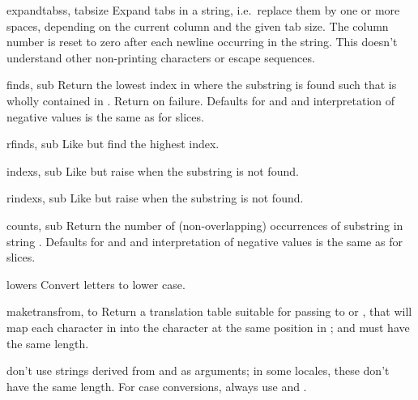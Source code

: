\begin{funcdesc}{expandtabs}{s, tabsize}
Expand tabs in a string, i.e.\ replace them by one or more spaces,
depending on the current column and the given tab size.  The column
number is reset to zero after each newline occurring in the string.
This doesn't understand other non-printing characters or escape
sequences.
\end{funcdesc}

\begin{funcdesc}{find}{s, sub}
Return the lowest index in  where the substring  is
found such that  is wholly contained in
.  Return  on failure.
Defaults for  and  and interpretation of negative
values is the same as for slices.
\end{funcdesc}

\begin{funcdesc}{rfind}{s, sub}
Like  but find the highest index.
\end{funcdesc}

\begin{funcdesc}{index}{s, sub}
Like  but raise  when the
substring is not found.
\end{funcdesc}

\begin{funcdesc}{rindex}{s, sub}
Like  but raise  when the
substring is not found.
\end{funcdesc}

\begin{funcdesc}{count}{s, sub}
Return the number of (non-overlapping) occurrences of substring
 in string .
Defaults for  and  and interpretation of negative
values is the same as for slices.
\end{funcdesc}

\begin{funcdesc}{lower}{s}
Convert letters to lower case.
\end{funcdesc}

\begin{funcdesc}{maketrans}{from, to}
Return a translation table suitable for passing to
 or , that will map
each character in  into the character at the same position
in ;  and  must have the same length. 

 don't use strings derived from  and
 as arguments; in some locales, these don't have the
same length.  For case conversions, always use  and
.
\end{funcdesc}

